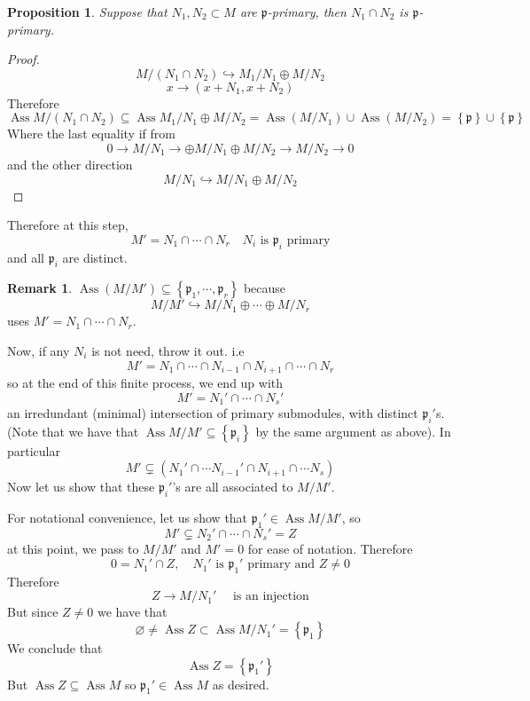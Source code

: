 \documentclass[11pt,a4paper]{article}
\theoremstyle{definition}
\newtheorem{remark}[definition]{Remark}
\theoremstyle{plain}
\newtheorem{proposition}[definition]{Proposition}
\theoremstyle{remark}
\renewcommand{\set}[1]{\left\{ #1 \right\}}
\newcommand{\Ass}{\operatorname{Ass}}
\begin{document}
\begin{proposition}
    Suppose that $N_1, N_2 \subset M$ are $\mathfrak{p}$-primary, then $N_1 \cap N_2$ is $\mathfrak{p}$-primary.
\end{proposition}

\begin{proof}
    $$M/(N_1 \cap N_2) \hookrightarrow M_1 / N_1 \oplus M / N_2$$
    $$x \to (x+N_1, x + N_2)$$
    Therefore 
    $$\Ass M/(N_1 \cap N_2) \subseteq \Ass M_1 / N_1 \oplus M / N_2 = \Ass (M/N_1) \cup \Ass(M/N_2) = \set{\mathfrak{p}} \cup \set{\mathfrak{p}}$$
    Where the last equality if from 
    $$0 \to M / N_1 \to  \oplus M / N_1 \oplus M / N_2 \to M / N_2 \to 0$$
    and the other direction 
    $$M / N_1 \hookrightarrow M/N_1 \oplus M/N_2$$
\end{proof}

Therefore at this step, 
$$M' = N_1 \cap \cdots \cap N_r \quad N_i \text{ is } \mathfrak{p}_i \text{ primary}$$
and all $\mathfrak{p}_i$ are distinct. 

\begin{remark}
    $\Ass (M/M') \subseteq \set{\mathfrak{p}_1, \cdots, \mathfrak{p}_r}$ because 
    $$M/M' \hookrightarrow M/N_1 \oplus \cdots \oplus M/N_r$$
    uses $M' = N_1 \cap \cdots \cap N_r$.
\end{remark}

Now, if any $N_i$ is not need, throw it out. i.e 
$$M' = N_1 \cap \cdots \cap N_{i-1} \cap N_{i+1} \cap \cdots \cap N_r$$
so at the end of this finite process, we end up with 
$$M' = N_1' \cap \cdots \cap N_s'$$
an irredundant (minimal) intersection of primary submodules, with distinct $\mathfrak{p}_i'$s. 
(Note that we have that $\Ass M/M' \subseteq \set{\mathfrak{p}_i}$ by the same argument as above). 
In particular 
$$M' \subsetneq (N_1' \cap \cdots N_{i-1}' \cap N_{i+1} \cap \cdots N_s)$$
Now let us show that these $\mathfrak{p}_i'$'s are all associated to $M/M'$. 

For notational convenience, let us show that $\mathfrak{p}_1' \in \Ass M/M'$, so 
$$M' \subsetneq N_2' \cap \cdots \cap N_s' = Z$$
at this point, we pass to $M/M'$ and $M' = 0$ for ease of notation. Therefore 
$$0 = N_1' \cap Z, \quad N_1' \text{ is $\mathfrak{p}_1'$ primary and $Z \ne 0$}$$
Therefore 
$$Z \to M/N_1' \quad \text{ is an injection}$$
But since $Z \ne 0$ we have that 
$$\varnothing \ne \Ass Z \subset \Ass M/N_1' = \set{\mathfrak{p}_1}$$
We conclude that 
$$\Ass Z = \set{\mathfrak{p}_1'}$$
But $\Ass Z \subseteq \Ass M$ so $\mathfrak{p}_1' \in \Ass M$ as desired.
\end{document}

